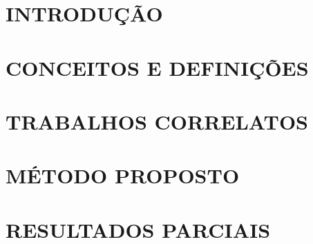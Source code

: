 \documentclass[
	12pt,				%
  oneside,
	a4paper,			%
	chapter=TITLE,		%
	english,			%
	brazil				%
	]{abntex2}
\begin{document}

\renewcommand{\contentsname}{Sumário}
\tableofcontents*
\cleardoublepage



\textual
\chapter{INTRODUÇÃO}


\chapter{CONCEITOS E DEFINIÇÕES}


\chapter{TRABALHOS CORRELATOS}


\chapter{MÉTODO PROPOSTO}



\chapter{RESULTADOS PARCIAIS}

\end{document}
